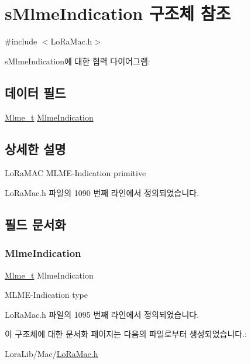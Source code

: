 \hypertarget{structs_mlme_indication}{}\section{s\+Mlme\+Indication 구조체 참조}
\label{structs_mlme_indication}


{\ttfamily \#include $<$Lo\+Ra\+Mac.\+h$>$}



s\+Mlme\+Indication에 대한 협력 다이어그램\+:
\subsection*{데이터 필드}
\begin{DoxyCompactItemize}
\item 
\mbox{\hyperlink{group___l_o_r_a_m_a_c_ga663544b83d50ec3518608be495896809}{Mlme\+\_\+t}} \mbox{\hyperlink{structs_mlme_indication_abf88ad0f120a91f75b72334fb2d2ea75}{Mlme\+Indication}}
\end{DoxyCompactItemize}


\subsection{상세한 설명}
Lo\+Ra\+M\+AC M\+L\+M\+E-\/\+Indication primitive 

Lo\+Ra\+Mac.\+h 파일의 1090 번째 라인에서 정의되었습니다.



\subsection{필드 문서화}
\mbox{\label{structs_mlme_indication_abf88ad0f120a91f75b72334fb2d2ea75}} 
\subsubsection{\texorpdfstring{Mlme\+Indication}{MlmeIndication}}
{\footnotesize\ttfamily \mbox{\hyperlink{group___l_o_r_a_m_a_c_ga663544b83d50ec3518608be495896809}{Mlme\+\_\+t}} Mlme\+Indication}

M\+L\+M\+E-\/\+Indication type 

Lo\+Ra\+Mac.\+h 파일의 1095 번째 라인에서 정의되었습니다.



이 구조체에 대한 문서화 페이지는 다음의 파일로부터 생성되었습니다.\+:\begin{DoxyCompactItemize}
\item 
Lora\+Lib/\+Mac/\mbox{\hyperlink{_lo_ra_mac_8h}{Lo\+Ra\+Mac.\+h}}\end{DoxyCompactItemize}
